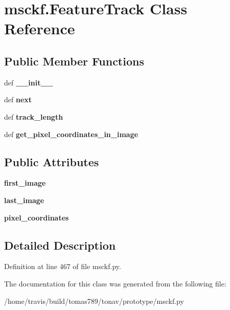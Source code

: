 \hypertarget{classmsckf_1_1_feature_track}{\section{msckf.\-Feature\-Track Class Reference}
\label{classmsckf_1_1_feature_track}
}
\subsection*{Public Member Functions}
\begin{DoxyCompactItemize}
\item 
\hypertarget{classmsckf_1_1_feature_track_aaf665104d4e01547cafe1042c17e9b79}{def {\bfseries \-\_\-\-\_\-init\-\_\-\-\_\-}}\label{classmsckf_1_1_feature_track_aaf665104d4e01547cafe1042c17e9b79}

\item 
\hypertarget{classmsckf_1_1_feature_track_a12f372278b1b14f7553540eb1db21f6f}{def {\bfseries next}}\label{classmsckf_1_1_feature_track_a12f372278b1b14f7553540eb1db21f6f}

\item 
\hypertarget{classmsckf_1_1_feature_track_a08861367ab5e5cce09ef93d2103ef875}{def {\bfseries track\-\_\-length}}\label{classmsckf_1_1_feature_track_a08861367ab5e5cce09ef93d2103ef875}

\item 
\hypertarget{classmsckf_1_1_feature_track_a04d7bc326bd668bb206eaeb36c4355c9}{def {\bfseries get\-\_\-pixel\-\_\-coordinates\-\_\-in\-\_\-image}}\label{classmsckf_1_1_feature_track_a04d7bc326bd668bb206eaeb36c4355c9}

\end{DoxyCompactItemize}
\subsection*{Public Attributes}
\begin{DoxyCompactItemize}
\item 
\hypertarget{classmsckf_1_1_feature_track_a664793a76ba15a7c337eb848aed653b5}{{\bfseries first\-\_\-image}}\label{classmsckf_1_1_feature_track_a664793a76ba15a7c337eb848aed653b5}

\item 
\hypertarget{classmsckf_1_1_feature_track_a91d7ca320a1c0273410fbb4d16ded316}{{\bfseries last\-\_\-image}}\label{classmsckf_1_1_feature_track_a91d7ca320a1c0273410fbb4d16ded316}

\item 
\hypertarget{classmsckf_1_1_feature_track_aa6ac9af251f5d7886075ee3ed2c3d892}{{\bfseries pixel\-\_\-coordinates}}\label{classmsckf_1_1_feature_track_aa6ac9af251f5d7886075ee3ed2c3d892}

\end{DoxyCompactItemize}


\subsection{Detailed Description}


Definition at line 467 of file msckf.\-py.



The documentation for this class was generated from the following file\-:\begin{DoxyCompactItemize}
\item 
/home/travis/build/tomas789/tonav/prototype/msckf.\-py\end{DoxyCompactItemize}
